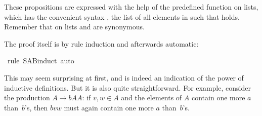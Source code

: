 \begin{isabellebody}
\isadelimproof
%
\endisadelimproof
%
\isatagproof
%
\begin{isamarkuptxt}%
\noindent
These propositions are expressed with the help of the predefined  function on lists, which has the convenient syntax , the list of all elements  in  such that 
holds. Remember that on lists  and  are synonymous.

The proof itself is by rule induction and afterwards automatic:%
\end{isamarkuptxt}%
\isamarkuptrue%
\isamarkupfalse%
\ {}rule\ S{}A{}B{}induct{}\ auto{}%
\endisatagproof
{\isafoldproof}%
%
\isadelimproof
%
\endisadelimproof
%
\begin{isamarkuptext}%
\noindent
This may seem surprising at first, and is indeed an indication of the power
of inductive definitions. But it is also quite straightforward. For example,
consider the production $A \to b A A$: if $v,w \in A$ and the elements of $A$
contain one more $a$ than~$b$'s, then $bvw$ must again contain one more $a$
than~$b$'s.


\end{isamarkuptext}
\end{isabellebody}
